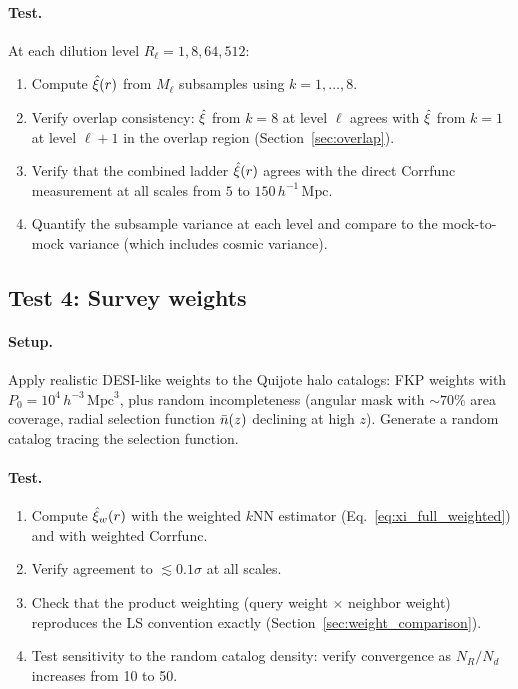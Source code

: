 \paragraph{Test.}  At each dilution level $R_\ell = 1, 8, 64, 512$:
\begin{enumerate}[nosep]
  \item Compute $\hat{\xi}(r)$ from $M_\ell$ subsamples using $k = 1, \ldots, 8$.
  \item Verify overlap consistency: $\hat{\xi}$ from $k = 8$ at level $\ell$ agrees with $\hat{\xi}$ from $k = 1$ at level $\ell + 1$ in the overlap region (Section~\ref{sec:overlap}).
  \item Verify that the combined ladder $\hat{\xi}(r)$ agrees with the direct Corrfunc measurement at all scales from $5$ to $150\,h^{-1}\,\mathrm{Mpc}$.
  \item Quantify the subsample variance at each level and compare to the mock-to-mock variance (which includes cosmic variance).
\end{enumerate}

\subsection{Test 4: Survey weights}
\label{sec:test_weights}

\paragraph{Setup.}  Apply realistic DESI-like weights to the Quijote halo catalogs: FKP weights with $P_0 = 10^4\,h^{-3}\,\mathrm{Mpc}^3$, plus random incompleteness (angular mask with $\sim 70\%$ area coverage, radial selection function $\bar{n}(z)$ declining at high $z$).  Generate a random catalog tracing the selection function.

\paragraph{Test.}
\begin{enumerate}[nosep]
  \item Compute $\hat{\xi}_w(r)$ with the weighted $k$NN estimator (Eq.~\ref{eq:xi_full_weighted}) and with weighted Corrfunc.
  \item Verify agreement to $\lesssim 0.1\sigma$ at all scales.
  \item Check that the product weighting (query weight $\times$ neighbor weight) reproduces the LS convention exactly (Section~\ref{sec:weight_comparison}).
  \item Test sensitivity to the random catalog density: verify convergence as $N_R / N_d$ increases from 10 to 50.
\end{enumerate}

